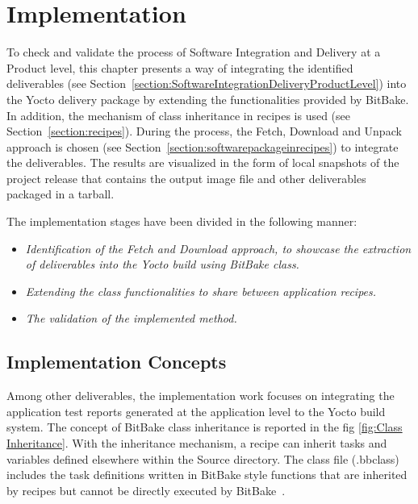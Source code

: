 
\chapter{Implementation} %

\label{Chapter 6} %

To check and validate the process of Software Integration and Delivery at a Product level, this chapter presents a way of integrating the identified deliverables (see Section~\ref{section:SoftwareIntegrationDeliveryProductLevel}) into the Yocto delivery package by extending the functionalities provided by BitBake. In addition, the mechanism of class inheritance in recipes is used (see Section~\ref{section:recipes}). During the process, the Fetch, Download and Unpack approach is chosen (see Section~\ref{section:softwarepackageinrecipes}) to integrate the deliverables. The results are visualized in the form of local snapshots of the project release that contains the output image file and other deliverables packaged in a tarball.

\vspace{0.2cm}
\noindent The implementation stages have been divided in the following manner:
\begin{itemize}
\item \emph{Identification of the Fetch and Download approach, to showcase the extraction of deliverables into the Yocto build using BitBake class.}
\item \emph{Extending the class functionalities to share between application recipes.}
\item \emph{The validation of the implemented method.}

\end{itemize}
\vspace{0.2cm}
\section{Implementation Concepts}

Among other deliverables, the implementation work focuses on integrating the application test reports generated at the application level to the Yocto build system. The concept of BitBake class inheritance is reported in the fig \ref{fig:Class Inheritance}. With the inheritance mechanism, a recipe can inherit tasks and variables defined elsewhere within the Source directory. The class file (.bbclass) includes the task definitions written in BitBake style functions that are inherited by recipes but cannot be directly executed by BitBake~\parencite{violanteembedded}.


